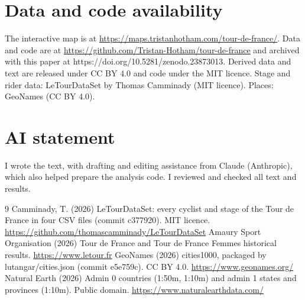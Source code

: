 \documentclass[11pt,a4paper]{article}
\begin{document}
\section*{Data and code availability}
The interactive map is at \url{https://maps.tristanhotham.com/tour-de-france/}. Data and code are at \url{https://github.com/Tristan-Hotham/tour-de-france} and archived with this paper at https://doi.org/10.5281/zenodo.23873013. Derived data and text are released under CC BY 4.0 and code under the MIT licence. Stage and rider data: LeTourDataSet by Thomas Camminady (MIT licence). Places: GeoNames (CC BY 4.0).

\section*{AI statement}
I wrote the text, with drafting and editing assistance from Claude (Anthropic), which also helped prepare the analysis code. I reviewed and checked all text and results.

\begin{thebibliography}{9}
 Camminady, T. (2026) LeTourDataSet: every cyclist and stage of the Tour de France in four CSV files (commit c377920). MIT licence. \url{https://github.com/thomascamminady/LeTourDataSet}
 Amaury Sport Organisation (2026) Tour de France and Tour de France Femmes historical results. \url{https://www.letour.fr}
 GeoNames (2026) cities1000, packaged by lutangar/cities.json (commit e5e759c). CC BY 4.0. \url{https://www.geonames.org/}
 Natural Earth (2026) Admin 0 countries (1:50m, 1:10m) and admin 1 states and provinces (1:10m). Public domain. \url{https://www.naturalearthdata.com/}
\end{thebibliography}
\end{document}
